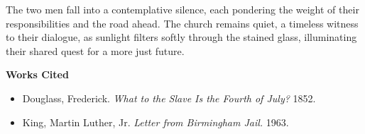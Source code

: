 \documentclass[12pt]{article}
\begin{document}
\bigskip

The two men fall into a contemplative silence, each pondering the weight of their responsibilities and the road ahead. The church remains quiet, a timeless witness to their dialogue, as sunlight filters softly through the stained glass, illuminating their shared quest for a more just future.

\bigskip

\noindent\textbf{Works Cited}

\begin{itemize}
    \item Douglass, Frederick. \textit{What to the Slave Is the Fourth of July?} 1852.
    \item King, Martin Luther, Jr. \textit{Letter from Birmingham Jail.} 1963.
\end{itemize}
\end{document}
